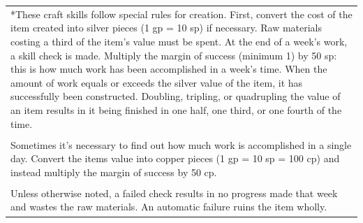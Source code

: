 \noindent
\begin{tabular}{p{}}
*These craft skills follow special rules for creation.  First, convert the cost of the item created into silver pieces (1 gp = 10 sp) if necessary.  Raw materials costing a third of the item's value must be spent.  At the end of a week's work, a skill check is made.  Multiply the margin of success (minimum 1) by 50 sp: this is how much work has been accomplished in a week's time.  When the amount of work equals or exceeds the silver value of the item, it has successfully been constructed.  Doubling, tripling, or quadrupling the value of an item results in it being finished in one half, one third, or one fourth of the time. \\
 \\
Sometimes it's necessary to find out how much work is accomplished in a single day.  Convert the items value into copper pieces (1 gp = 10 sp = 100 cp) and instead multiply the margin of success by 50 cp. \\
 \\ 
Unless otherwise noted, a failed check results in no progress made that week and wastes the raw materials. An automatic failure ruins the item wholly. \\
\end{tabular}\vspace{.5em}
